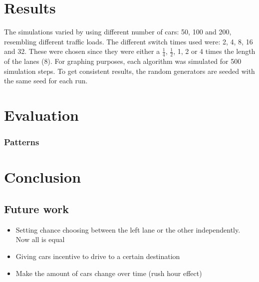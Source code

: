 \documentclass[a4paper,11pt]{article}
\begin{document}

\section{Results}\label{sec:results}
The simulations varied by using different number of cars: 50, 100 and 200,
resembling different traffic loads.
The different switch times used were: 2, 4, 8, 16 and 32.
These were chosen since they were either a $\frac{1}{4}$, $\frac{1}{2}$, 1, 2 or 4 times the length of the lanes (8).
For graphing purposes, each algorithm was simulated for 500 simulation steps.
To get consistent results, the random generators are seeded with the same seed for each run.




\section{Evaluation}\label{sec:eval}


\subsubsection*{Patterns}


\section{Conclusion}\label{sec:conclusion}


\subsection{Future work}

\begin{itemize}
 \item Setting chance choosing between the left lane or the other independently. Now all is equal %
 \item Giving cars incentive to drive to a certain destination
 \item Make the amount of cars change over time (rush hour effect)
\end{itemize}





\end{document}
